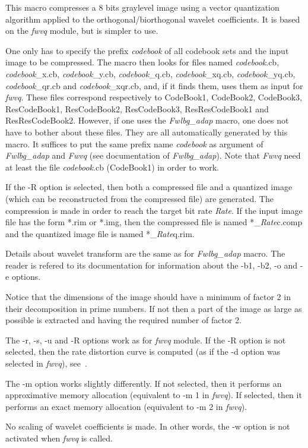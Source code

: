 This macro compresses a 8 bits graylevel image using a vector quantization 
 algorithm applied to the orthogonal/biorthogonal 
wavelet coefficients. 
It is based on the {\em fwvq} module, but is simpler to use. 

One only has to specify the prefix {\em codebook} of all codebook sets 
and the input image to be compressed. The macro then looks for files 
named {\em codebook}.cb, {\em codebook}\_x.cb, {\em codebook}\_y.cb, 
{\em codebook}\_q.cb, {\em codebook}\_xq.cb, {\em codebook}\_yq.cb, 
{\em codebook}\_qr.cb and {\em codebook}\_xqr.cb, and, if it finds them, 
uses them as input for {\em fwvq}. These files correspond respectively to 
CodeBook1, CodeBook2, CodeBook3, ResCodeBook1, ResCodeBook2, ResCodeBook3, 
ResResCodeBook1 and ResResCodeBook2. 
However, if one uses the {\em Fwlbg\_adap} macro, one does not have to 
bother about these files. They are all automatically generated by this macro. 
It suffices to put the same prefix name {\em codebook} as argument 
of {\em Fwlbg\_adap} and {\em Fwvq} (see documentation of {\em Fwlbg\_adap}). 
Note that {\em Fwvq} need at least the file {\em codebook}.cb (CodeBook1) 
in order to work. 

If the -R option is selected, then both a compressed file and a quantized 
image (which can be reconstructed from the compressed file) are generated. 
The compression is made in order to reach the target bit rate {\em Rate}. 
If the input image file has the form *.rim or *.img, then 
the compressed file is named *\_{\em Rate}c.comp and the quantized image file 
is named *\_{\em Rate}q.rim.

Details about wavelet transform are the same as for {\em Fwlbg\_adap} macro. 
The reader is refered to its documentation for information about the -b1, -b2, 
-o and -e options. 

Notice that the dimensions of the image should have a minimum of factor 2 
in their decomposition in prime numbers. If not then a part of the 
image as large as possible is extracted and having the required 
number of factor 2. 

The -r, -s, -u and -R options work as for {\em fwvq} module. If the -R 
option is not selected, then the rate distortion curve is computed 
(as if the -d option was selected in {\em fwvq}), see~\cite{gersho.gray:vector}. 

The -m option works slightly differently. If not selected, then it 
performs an approximative memory allocation (equivalent to -m 1 
in {\em fwvq}). If selected, then it performs an exact memory allocation 
(equivalent to -m 2 in {\em fwvq}).

No scaling of wavelet coefficients is made. In other words, 
the -w option is not activated when {\em fwvq} is called. 

